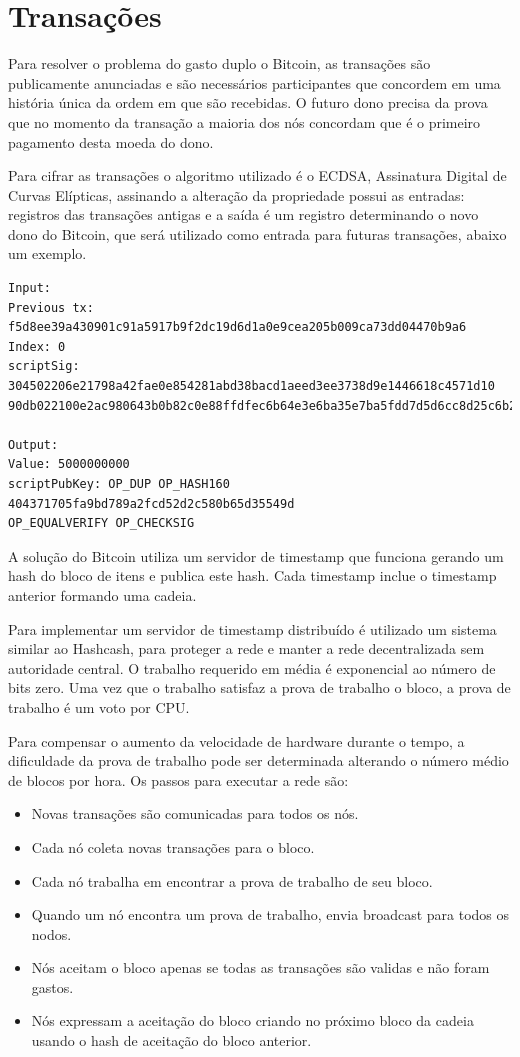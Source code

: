 \documentclass[a4paper,11pt]{article}
\theoremstyle{mytheor}
\begin{document}
\section*{Transações}
Para resolver o problema do gasto duplo o Bitcoin, as transações são publicamente anunciadas e são necessários participantes que concordem em uma história única da ordem em que são recebidas. O futuro dono precisa da prova que no momento da transação a maioria dos nós concordam que é o primeiro pagamento desta moeda do dono.

Para cifrar as transações o algoritmo utilizado é o  ECDSA, Assinatura Digital de Curvas Elípticas, assinando a alteração da propriedade possui as entradas: registros das transações antigas e a saída é um registro determinando o novo dono do Bitcoin, que será utilizado como entrada para futuras transações, abaixo um exemplo.

\begin{lstlisting}[Exemplo de uma transação Bitcoin com uma entrada e uma saída apenas]
Input:
Previous tx: f5d8ee39a430901c91a5917b9f2dc19d6d1a0e9cea205b009ca73dd04470b9a6
Index: 0
scriptSig: 304502206e21798a42fae0e854281abd38bacd1aeed3ee3738d9e1446618c4571d10
90db022100e2ac980643b0b82c0e88ffdfec6b64e3e6ba35e7ba5fdd7d5d6cc8d25c6b241501

Output:
Value: 5000000000
scriptPubKey: OP_DUP OP_HASH160 404371705fa9bd789a2fcd52d2c580b65d35549d
OP_EQUALVERIFY OP_CHECKSIG
\end{lstlisting}

A solução do Bitcoin utiliza um servidor de timestamp que funciona gerando um hash do bloco de itens e publica este hash. Cada timestamp inclue o timestamp anterior formando uma cadeia.

Para implementar um servidor de timestamp distribuído é utilizado um sistema similar ao Hashcash, para proteger a rede e manter a rede decentralizada sem autoridade central. O trabalho requerido em média é exponencial ao número de bits zero. Uma vez que o trabalho satisfaz a prova de trabalho o bloco, a prova de trabalho é um voto por CPU.

Para compensar o aumento da velocidade de hardware durante o tempo, a dificuldade da prova de trabalho pode ser determinada alterando o número médio de blocos por hora. Os passos para executar a rede são:
\begin{itemize}
    \item Novas transações são comunicadas para todos os nós.
    \item Cada nó coleta novas transações para o bloco.
    \item Cada nó trabalha em encontrar a prova de trabalho de seu bloco.
    \item Quando um nó encontra um prova de trabalho, envia broadcast para todos os nodos.
    \item Nós aceitam o bloco apenas se todas as transações são validas e não foram gastos.
    \item Nós expressam a aceitação do bloco criando no próximo bloco da cadeia usando o hash de aceitação do bloco anterior.
\end{itemize}
\end{document}
